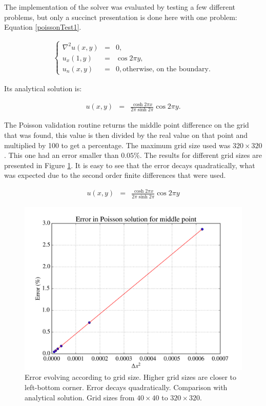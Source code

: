 \documentclass[journal]{IEEEtran}
\begin{document}
The implementation of the solver was evaluated by testing a few different problems, but only a succinct presentation is done here with one problem: Equation \ref{poissonTest1}. 

\begin{eqnarray}
\left\{\begin{array}{ccl}
\nabla^2u(x,y) & = & 0,\\
u_x(1,y) & = & \cos 2\pi y,\\
u_n(x,y) & = & 0, \textrm{otherwise, on the boundary}.
\end{array}\right. \label{poissonTest1}
\end{eqnarray}

Its analytical solution is:

\begin{eqnarray}
u(x,y) & = & \frac{\cosh 2\pi x}{2\pi \sinh 2\pi}\cos 2 \pi y .\label{solutionPoissonTest1}
\end{eqnarray}


The Poisson validation routine returns the middle point difference on the grid that was found, this value is then divided by the real value on that point and multiplied by 100 to get a percentage. The maximum grid size used was $320\times 320$. This one had an error smaller than $0.05\%$. The results for different grid sizes are presented in Figure \ref{errorPoissonTest}. It is easy to see that the error decays quadratically, what was expected due to the second order finite differences that were used.



\begin{eqnarray}
u(x,y) & = & \frac{\cosh 2\pi x}{2\pi \sinh 2\pi}\cos 2 \pi y \label{solutionPoissonTest1}
\end{eqnarray}

\begin{figure}[!ht]
\centering
\includegraphics[width=\linewidth]{figures/validatePoissonP2}
\caption{Error evolving according to grid size. Higher grid sizes are closer to left-bottom corner. Error decays quadratically. Comparison with analytical solution. Grid sizes from $40\times 40$ to $320\times 320$. \label{errorPoissonTest}}
\end{figure}
\end{document}
